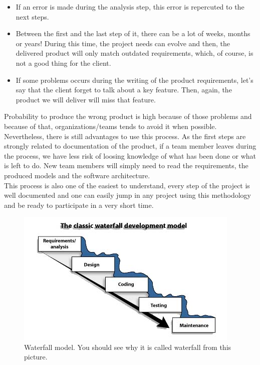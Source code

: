 \documentclass[12pt]{article}
\theoremstyle{definition}
\theoremstyle{definition}
\theoremstyle{remark}
\begin{document}
\begin{itemize}

\item If an error is made during the analysis step, this error is repercuted to the next steps.
\item Between the first and the last step of it, there can be a lot of weeks, months or years! During this time, the project needs can evolve and then, the delivered product will only match outdated requirements, which, of course, is not a good thing for the client.
\item If some problems occurs during the writing of the product requirements, let's say that the client forget to talk about a key feature. Then, again, the product we will deliver will miss that feature.

\end{itemize}

Probability to produce the wrong product is high because of those problems and because of that, organizations/teams tends to avoid it when possible. Nevertheless, there is still advantages to use this process. As the first steps are strongly related to documentation of the product, if a team member leaves during the process, we have less risk of loosing knowledge of what has been done or what is left to do. New team members will simply need to read the requirements, the produced models and the software architecture.\\

This process is also one of the easiest to understand, every step of the project is well documented and one can easily jump in any project using this methodology and be ready to participate in a very short time.\\

\begin{figure}
    \centering
    \includegraphics[scale=0.8]{waterfall.jpg}
    \caption{Waterfall model. You should see why it is called waterfall from this picture.}
    \label{Waterfall}
\end{figure}
\end{document}
